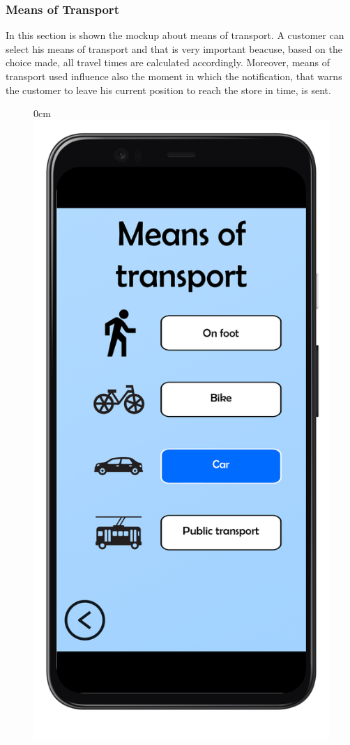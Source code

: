 \documentclass{article}
\begin{document}
		\newpage
		
		\subsubsection{Means of Transport}
		
		In this section is shown the mockup about means of transport. A customer can select his means of transport and that is very important beacuse, based on the choice made, all travel times are calculated accordingly. Moreover, means of transport used influence also the moment in which the notification, that warns the customer to leave his current position to reach the store in time, is sent.
		\bigskip
		\bigskip
		\begin{figure}[H]
			\begin{adjustwidth} {0cm}{}
				\centering
				\includegraphics[scale=0.17]{../Mockups/MeansOfTransport.png}\\

\end{adjustwidth}
\end{figure}
\end{document}
